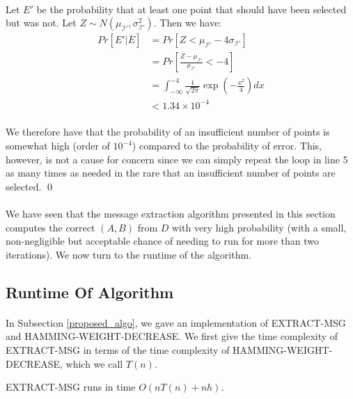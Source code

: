 \paragraph{}
Let $E'$ be the probability that at least one point that should have been selected but was not. Let $Z \sim N(\mu_{\mathcal{I}'}, \sigma_{\mathcal{I}'}^2)$. Then we have:
\begin{align*}
    Pr[E' | \overline{E}] &= Pr[Z < \mu_{\mathcal{I}'} - 4 \sigma_{\mathcal{I}'}]\\
    &= Pr[\frac{Z - \mu_{\mathcal{I}'}}{\sigma_{\mathcal{I}'}} < -4]\\
    &= \int_{-\infty}^{-4} \frac{1}{\sqrt{2 \pi}} \exp{(-\frac{x^2}{4})} dx\\
    &< 1.34 \times 10^{-4}
\end{align*}

\paragraph{}
We therefore have that the probability of an insufficient number of points is somewhat high (order of $10^{-4}$) compared to the probability of error. This, however, is not a cause for concern since we can simply repeat the loop in line 5 as many times as needed in the rare that an insufficient number of points are selected. \qed

\paragraph{}
We have seen that the message extraction algorithm presented in this section computes the correct $(A,B)$ from $D$ with very high probability (with a small, non-negligible but acceptable chance of needing to run for more than two iterations). We now turn to the runtime of the algorithm.

\subsection{Runtime Of Algorithm}
\paragraph{}
In Subsection \ref{proposed_algo}, we gave an implementation of EXTRACT-MSG and HAMMING-WEIGHT-DECREASE. We first give the time complexity of EXTRACT-MSG in terms of the time complexity of HAMMING-WEIGHT-DECREASE, which we call $T(n)$.

\begin{lemma}
EXTRACT-MSG runs in time $O(n T(n) + nh)$.
\end{lemma}
